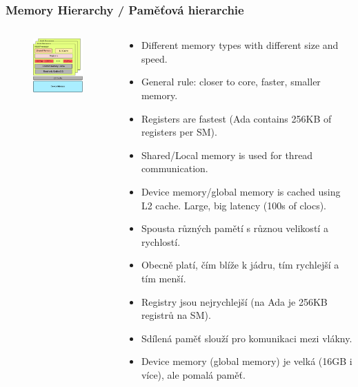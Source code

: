 \begin{frame}
  \frametitle{Memory Hierarchy / Paměťová hierarchie}
  \begin{columns}[T]
    \begin{column}{.48\textwidth}
      \begin{figure}[h]
        \includegraphics[width=5cm,keepaspectratio]{pics/gpu/memory_hierarchy}
      \end{figure}
    \end{column}
    \begin{column}{.48\textwidth}
      \scriptsize
      \begin{itemize}
        \item Different memory types with different size and speed.
        \item General rule: closer to core, faster, smaller memory.
        \item Registers are fastest (Ada contains 256KB of registers per SM).
        \item Shared/Local memory is used for thread communication.
        \item Device memory/global memory is cached using L2 cache. Large, big latency (100s of clocs).
      \end{itemize}

      \begin{itemize}
        \item Spousta různých pamětí s různou velikostí a rychlostí.
        \item Obecně platí, čím blíže k jádru, tím rychlejší a tím menší.
        \item Registry jsou nejrychlejší (na Ada je 256KB registrů na SM).
        \item Sdílená paměť slouží pro komunikaci mezi vlákny.
        \item Device memory (global memory) je velká (16GB i více), ale pomalá paměť.
      \end{itemize}
    \end{column}
  \end{columns}
\end{frame}

